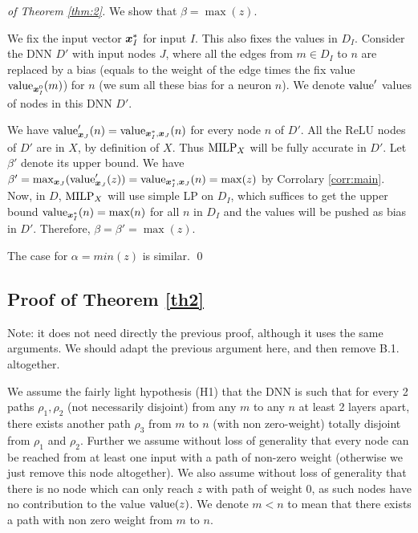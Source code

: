 			
\begin{proof}[of Theorem \ref{thm:2}]
	We show that $\beta=\max(z)$.

	We fix the input vector $\boldsymbol{x}^*_I$ for input $I$.
	This also fixes the values in $D_I$.
	Consider the DNN $D'$ with input nodes $J$, where all the 
	edges from $m \in D_I$ to $n$ are replaced by a bias (equals to the weight of the edge times the fix value ${\textrm{value}}_{\boldsymbol{x}^0_I}(m)$) for $n$ (we sum all these bias for a neuron $n$).
	We denote ${\textrm{value}}'$ values of nodes in this DNN $D'$.
		 
	We have ${\textrm{value}}'_{\boldsymbol{x}_J}(n)={\textrm{value}}_{\boldsymbol{x}^*_I,\boldsymbol{x}_J}(n)$ 
	for every node $n$ of $D'$. All the ReLU nodes of $D'$ are in $X$, by definition of $X$.
Thus ${\textrm{MILP}}_X$ will be fully accurate in $D'$. Let $\beta'$ denote its upper bound.
We have $\beta'=\max_{\boldsymbol{x}{_J}} ({\textrm{value}}'_{\boldsymbol{x}_{J}}(z)) = 
{\textrm{value}}_{\boldsymbol{x}^*_I,\boldsymbol{x}_J}(n) = \max(z)$ by Corrolary \ref{corr:main}.
Now, in $D$, ${\textrm{MILP}}_X$ will use simple LP on $D_I$, which suffices to get the upper bound ${\textrm{value}}_{\boldsymbol{x}^*_I}(n)=\max(n)$ for all $n$ in $D_I$ and the values will be pushed as bias in $D'$. Therefore, $\beta=\beta'=\max(z)$.

The case for $\alpha=min(z)$ is similar. \qed
	
\end{proof}
			
\subsection{Proof of Theorem \ref{th2}}
			
Note: it does not need directly the previous proof, although it uses the same arguments.
We should adapt the previous argument here, and then remove B.1. altogether.

We assume the fairly light hypothesis (H1) that the DNN is such that for every 2 paths $\rho_1,\rho_2$ (not necessarily disjoint) from any $m$ to any $n$ at least 2 layers apart, there exists another path $\rho_3$ from $m$ to $n$ (with non zero-weight) totally disjoint from $\rho_1$ and $\rho_2$. Further we assume without loss of generality that every node can be reached from at least one input with a path of non-zero weight (otherwise we just remove this node altogether).
We also assume without loss of generality that there is no node which can only reach $z$ with path of weight $0$, as such nodes have no contribution to the value ${\textrm{value}}(z)$. We denote $m<n$ to mean that there exists a path with non zero weight from $m$ to $n$.

